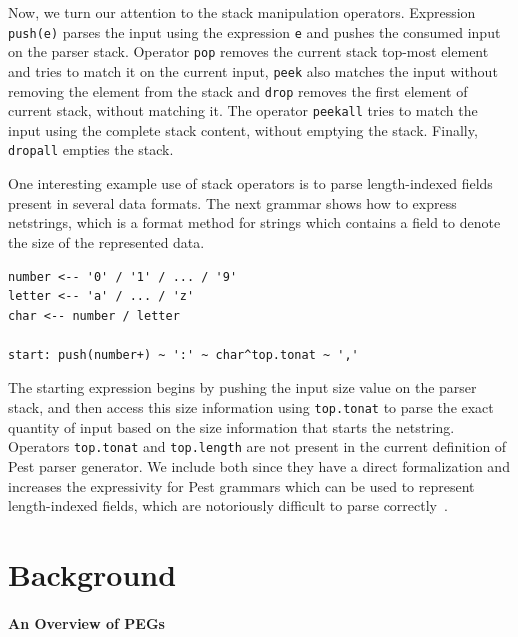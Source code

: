 \documentclass[preprint,12pt]{elsarticle}
\theoremstyle{definition}
\begin{document}
Now, we turn our attention to the stack manipulation operators. Expression
\verb|push(e)| parses the input using the expression \texttt{e} and pushes the
consumed input on the parser stack. Operator \verb|pop| removes the current
stack top-most element and tries to match it on the current input,
\verb|peek| also matches the input without removing the element from the
stack and \verb|drop| removes the first element of current stack, without
matching it. The operator \verb|peekall| tries to match the input using the
complete stack content, without emptying the stack. Finally, \verb|dropall|
empties the stack.

One interesting example use of stack operators is to parse
length-indexed fields present in several data formats.
The next grammar shows how to express netstrings, which is a format method
for strings which contains a field to denote the size of the represented data.
\begin{verbatim}
number <-- '0' / '1' / ... / '9'
letter <-- 'a' / ... / 'z'
char <-- number / letter

start: push(number+) ~ ':' ~ char^top.tonat ~ ','
\end{verbatim}
The starting expression begins by pushing the input size value on the parser stack,
and then access this size information using \verb|top.tonat| to parse the exact
quantity of input based on the size information that starts the netstring.
Operators \verb|top.tonat| and \verb|top.length| are not present in the current
definition of Pest parser generator. We include both since they have a direct
formalization and increases the expressivity for Pest grammars which can be used
to represent length-indexed fields, which are notoriously difficult to parse
correctly~\cite{Zhang23, Lucks17}.


\section{Background}\label{sec:background}

\paragraph{An Overview of PEGs}
\end{document}
